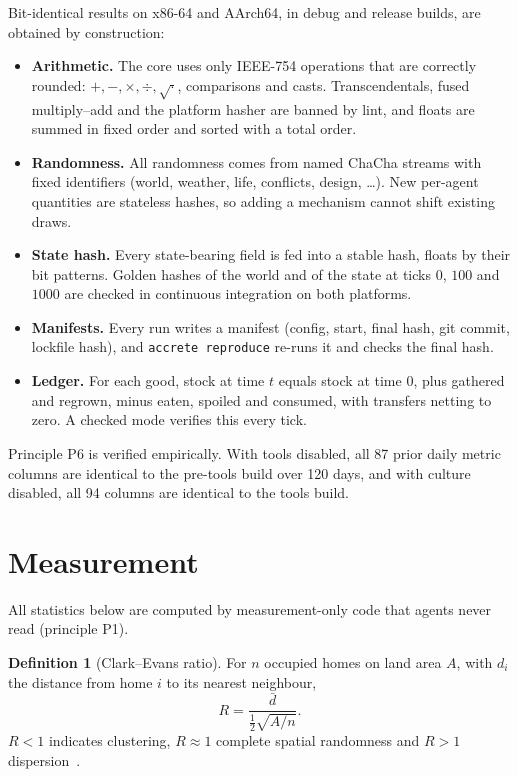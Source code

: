 \documentclass[11pt]{article}
\theoremstyle{definition}
\newtheorem{definition}{Definition}
\newcommand{\1}{\mathbf{1}}
\begin{document}
Bit-identical results on x86-64 and AArch64, in debug and release builds, are obtained by construction:
\begin{itemize}
\item \textbf{Arithmetic.} The core uses only IEEE-754 operations that are correctly rounded: $+,-,\times,\div,\sqrt{\cdot}$, comparisons and casts. Transcendentals, fused multiply--add and the platform hasher are banned by lint, and floats are summed in fixed order and sorted with a total order.
\item \textbf{Randomness.} All randomness comes from named ChaCha streams with fixed identifiers (world, weather, life, conflicts, design, \dots). New per-agent quantities are stateless hashes, so adding a mechanism cannot shift existing draws.
\item \textbf{State hash.} Every state-bearing field is fed into a stable hash, floats by their bit patterns. Golden hashes of the world and of the state at ticks $0$, $100$ and $1000$ are checked in continuous integration on both platforms.
\item \textbf{Manifests.} Every run writes a manifest (config, start, final hash, git commit, lockfile hash), and \texttt{accrete reproduce} re-runs it and checks the final hash.
\item \textbf{Ledger.} For each good, stock at time $t$ equals stock at time $0$, plus gathered and regrown, minus eaten, spoiled and consumed, with transfers netting to zero. A checked mode verifies this every tick.
\end{itemize}
Principle P6 is verified empirically. With tools disabled, all 87 prior daily metric columns are identical to the pre-tools build over 120 days, and with culture disabled, all 94 columns are identical to the tools build.

\section{Measurement}\label{sec:measure}

All statistics below are computed by measurement-only code that agents never read (principle P1).

\begin{definition}[Clark--Evans ratio]
For $n$ occupied homes on land area $A$, with $d_i$ the distance from home $i$ to its nearest neighbour,
\[R = \frac{\bar d}{\tfrac12\sqrt{A/n}}.\]
$R<1$ indicates clustering, $R\approx1$ complete spatial randomness and $R>1$ dispersion~\cite{clark1954}.
\end{definition}
\end{document}
